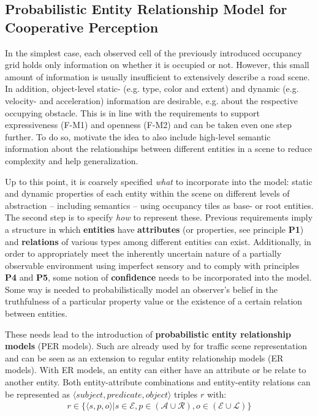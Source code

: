 \subsection{Probabilistic Entity Relationship Model for Cooperative Perception}
\label{subsec:concept_design:probabilistic_entity_relationship_model_for_cooperative_perception}

In the simplest case, each observed cell of the previously introduced occupancy grid holds only information on whether it is occupied or not. However, this  small amount of information is usually insufficient to extensively describe a road scene. In addition, object-level static- (e.g. type, color and extent) and dynamic (e.g. velocity- and acceleration) information are desirable, e.g. about the respective occupying obstacle. This is in line with the requirements to support expressiveness (F-M1) and openness (F-M2) and can be taken even one step further. To do so, \cite{Kohlhaas2014, Petrich2018} motivate the idea to also include high-level semantic information about the relationships between different entities in a scene to reduce complexity and help generalization. 
\par
\bigskip

Up to this point, it is coarsely specified \textit{what} to incorporate into the model: static and dynamic properties of each entity within the scene on different levels of abstraction – including semantics – using occupancy tiles as base- or root entities. The second step is to specify \textit{how} to represent these. Previous requirements imply a structure in which \textbf{entities} have \textbf{attributes} (or properties, see principle \textbf{P1}) and \textbf{relations} of various types among different entities can exist. Additionally, in order to appropriately meet the inherently uncertain nature of a partially observable environment using imperfect sensory and to comply with principles \textbf{P4} and \textbf{P5}, some notion of \textbf{confidence} needs to be incorporated into the model. Some way is needed to probabilistically model an observer's belief in the truthfulness of a particular property value or the existence of a certain relation between entities. 

These needs lead to the introduction of \textbf{probabilistic entity relationship models} (PER models). Such are already used by \cite{Petrich2018} for traffic scene representation and can be seen as an extension to regular entity relationship models (ER models). With ER models, an entity can either have an attribute or be relate to another entity. Both entity-attribute combinations and entity-entity relations can be represented as $\langle subject, predicate, object \rangle$ triples $r$ with:
\begin{gather}
	r \in \{ \langle s, p, o \rangle | s \in \mathcal{E}, p \in (\mathcal{A} \cup \mathcal{R}), o \in (\mathcal{E} \cup \mathcal{L}) \}
	\label{eq:triples}
\end{gather}

